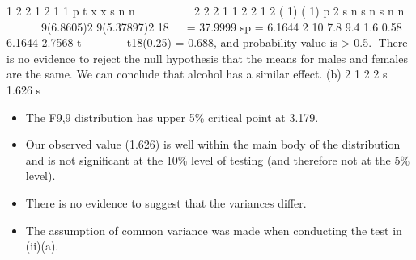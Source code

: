 \documentclass[a4paper,12pt]{article}
\begin{document}
1 2
2
1 2
1 1
p
t x x
s
n n


 
  
 	
2 2
2 1 1 2 2
1 2
( 1) ( 1)
p 2
s n s n s
n n
  

 
9(6.8605)2 9(5.37897)2
18

 = 37.9999
sp = 6.1644
2
10
7.8 9.4 1.6 0.58
6.1644 2.7568
t  
   
t18(0.25) = 0.688, and probability value is > 0.5.
There is no evidence to reject the null hypothesis that the means for
males and females are the same.
We can conclude that alcohol has a similar effect.
(b)
2
1
2
2
s 1.626
s


\begin{itemize}
    \item The F9,9 distribution has upper 5\% critical point at 3.179.
    \item Our
observed value (1.626) is well within the main body of the distribution
and is not significant at the 10\% level of testing (and therefore not at
the 5\% level). 
\item There is no evidence to suggest that the variances
differ. 
\item The assumption of common variance was made when
conducting the test in (ii)(a).
\end{itemize}
\end{document}
